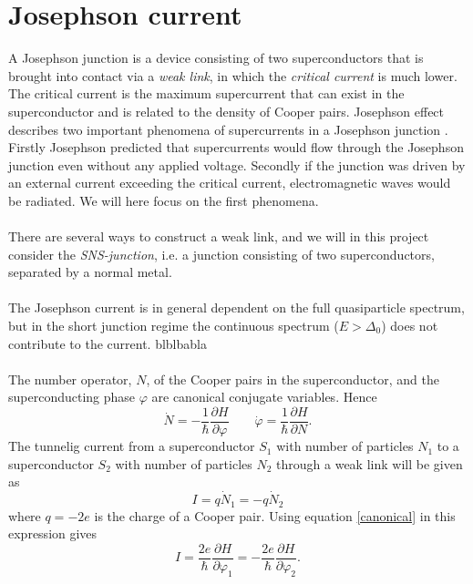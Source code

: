 \section{Josephson current}
\label{sec:Josephson}
A Josephson junction is a device consisting of two superconductors that is brought into contact via a \textit{weak link}, in which the \textit{critical current} is much lower. The critical current is the maximum supercurrent that can exist in the superconductor and is related to the density of Cooper pairs. Josephson effect describes two important phenomena of supercurrents in a Josephson junction \cite{josephson62}. Firstly Josephson predicted that supercurrents would flow through the Josephson junction even without any applied voltage. Secondly if the junction was driven by an external current exceeding the critical current, electromagnetic waves would be radiated. We will here focus on the first phenomena.
\\
\\
There are several ways to construct a weak link, and we will in this project consider the \textit{SNS-junction}, i.e. a junction consisting of two superconductors, separated by a normal metal.
\\
\\
The Josephson current is in general dependent on the full quasiparticle spectrum, but in the short junction regime the continuous spectrum ($E>\Delta_0$) does not contribute to the current. blblbabla
\\
\\
The number operator, $N$, of the Cooper pairs in the superconductor, and the superconducting phase $\varphi$ are canonical conjugate variables. Hence
\begin{equation}
    \dot{N} = -\frac{1}{\hbar}\frac{\partial H}{\partial \varphi}
    \qquad
    \dot{\varphi} = \frac{1}{\hbar}\frac{\partial H}{\partial N}.
    \label{canonical}
\end{equation}
The tunnelig current from a superconductor $S_1$ with number of particles $N_1$ to a superconductor $S_2$ with number of particles $N_2$ through a weak link will be given as
\begin{equation}
    I = q \dot{N}_1 = -q \dot{N}_2
\end{equation}
where $q=-2e$ is the charge of a Cooper pair. Using equation \eqref{canonical} in this expression gives
\begin{equation}
    I = \frac{2e}{\hbar}\frac{\partial H}{\partial \varphi_1} = -\frac{2e}{\hbar}\frac{\partial H}{\partial \varphi_2}.
\end{equation}
